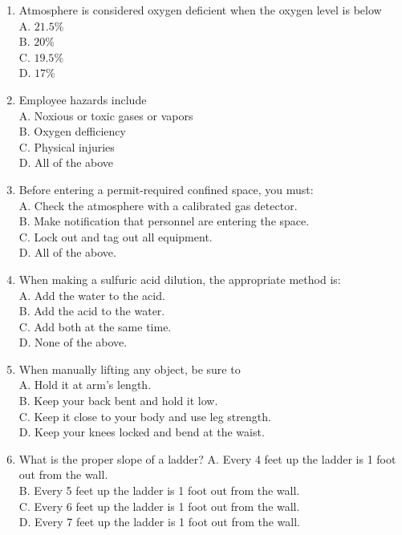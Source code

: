 \documentclass[10pt]{article}
\begin{document}
\begin{enumerate}
\begin{enumerate}
\begin{enumerate}
  \item Atmosphere is considered oxygen deficient when the oxygen level is below\\
A. $21.5 \%$\\
B. $20 \%$\\
C. $19.5 \%$\\
D. $17 \%$\\

  \item Employee hazards include\\
A. Noxious or toxic gases or vapors\\
B. Oxygen defficiency\\
C. Physical injuries\\
D. All of the above

  \item Before entering a permit-required confined space, you must:\\
A. Check the atmosphere with a calibrated gas detector.\\
B. Make notification that personnel are entering the space.\\
C. Lock out and tag out all equipment.\\
D. All of the above.

  \item When making a sulfuric acid dilution, the appropriate method is:\\
A. Add the water to the acid.\\
B. Add the acid to the water.\\
C. Add both at the same time.\\
D. None of the above.

  \item When manually lifting any object, be sure to\\
A. Hold it at arm's length.\\
B. Keep your back bent and hold it low.\\
C. Keep it close to your body and use leg strength.\\
D. Keep your knees locked and bend at the waist.\\

  \item What is the proper slope of a ladder?
A. Every 4 feet up the ladder is 1 foot out from the wall.\\
B. Every 5 feet up the ladder is 1 foot out from the wall.\\
C. Every 6 feet up the ladder is 1 foot out from the wall.\\
D. Every 7 feet up the ladder is 1 foot out from the wall.


\end{enumerate}
\end{enumerate}
\end{enumerate}
\end{document}
